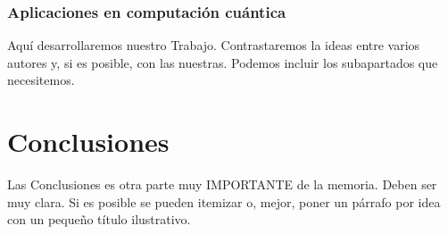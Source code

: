 \documentclass[11pt,a4paper,spanish]{book}
\begin{document}
\subsection{Aplicaciones en computación cuántica}


Aquí desarrollaremos nuestro Trabajo. Contrastaremos la ideas entre varios autores y, si es posible, con las nuestras. Podemos incluir los subapartados que necesitemos.

\chapter{Conclusiones}

Las Conclusiones es otra parte muy IMPORTANTE de la memoria. Deben ser muy clara. Si es posible se pueden itemizar o, mejor, poner un párrafo por idea con un pequeño título ilustrativo.
\end{document}
